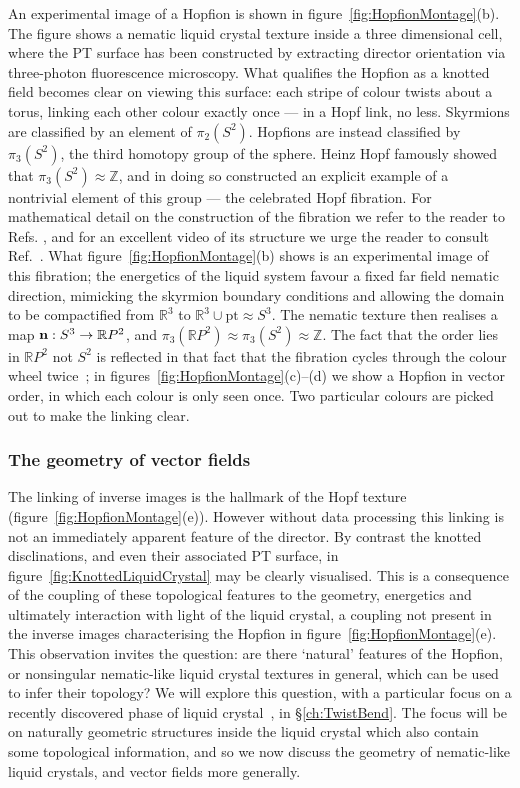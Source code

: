 An experimental image of a Hopfion is shown in figure~\ref{fig:HopfionMontage}(b)\citep{ChenThesis,Chen2013}. The figure shows a nematic liquid crystal texture inside a three dimensional cell, where the PT surface has been constructed by extracting director orientation via three-photon fluorescence microscopy. What qualifies the Hopfion as a knotted field becomes clear on viewing this surface: each stripe of colour twists about a torus, linking each other colour exactly once --- in a Hopf link, no less. Skyrmions are classified by an element of $\pi_2(S^2)$. Hopfions are instead classified by $\pi_3(S^2)$, the third homotopy group of the sphere. Heinz Hopf famously showed that $\pi_3(S^2) \approx \mathbb{Z}$, and in doing so constructed an explicit example of a nontrivial element of this group --- the celebrated Hopf fibration. For mathematical detail on the construction of the fibration we refer to the reader to Refs. \citep{BottTuBook,AlexanderBook}, and for an excellent video of its structure we urge the reader to consult Ref.~\citep{Johnson2011}. What figure~\ref{fig:HopfionMontage}(b) shows is an experimental image of this fibration; the energetics of the liquid system favour a fixed far field nematic direction, mimicking the skyrmion boundary conditions and allowing the domain to be compactified  from $\mathbb{R}^3$ to $\mathbb{R}^3 \cup \textrm{pt} \approx {S}^3$. The nematic texture then realises a map ${\bf n}: S^3 \rightarrow \mathbb{R}P^2$, and $\pi_3(\mathbb{R}P^2) \approx \pi_3(S^2) \approx \mathbb{Z}$. The fact that the order lies in $\mathbb{R}P^2$ not $S^2$ is reflected in that fact that the fibration cycles through the colour wheel twice~\citep{Chen2013,Ackerman2017}; in figures~\ref{fig:HopfionMontage}(c)--(d) we show a Hopfion in vector order, in which each colour is only seen once. Two particular colours are picked out to make the linking clear.
\subsubsection{The geometry of vector fields}
\label{subsec:Geometry}
The linking of inverse images is the hallmark of the Hopf texture (figure~\ref{fig:HopfionMontage}(e)). However without data processing this linking is not an immediately apparent feature of the director. By contrast the knotted disclinations, and even their associated PT surface, in figure~\ref{fig:KnottedLiquidCrystal} may be clearly visualised. This is a consequence of the coupling of these topological features to the geometry, energetics and ultimately interaction with light of the liquid crystal, a coupling not present in the inverse images characterising the Hopfion in figure~\ref{fig:HopfionMontage}(e). This observation invites the question: are there `natural' features of the Hopfion, or nonsingular nematic-like liquid crystal textures in general, which can be used to infer their topology? We will explore this question, with a particular focus on a recently discovered phase of liquid crystal~\citep{Lavrentovich2018}, in \S\ref{ch:TwistBend}. The focus will be on naturally geometric structures inside the liquid crystal which also contain some topological information, and so we now discuss the geometry of nematic-like liquid crystals, and vector fields more generally. 

